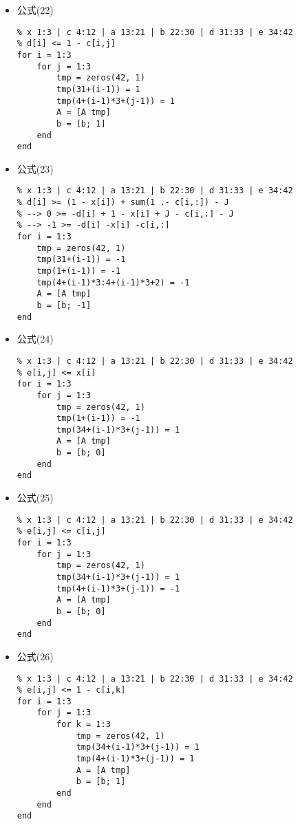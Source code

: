\documentclass[onecolumn,times]{article}
\begin{document}
\begin{CJK}{UTF8}{gkai}
\begin{itemize}
\item 公式(22)
\begin{Verbatim}
% x 1:3 | c 4:12 | a 13:21 | b 22:30 | d 31:33 | e 34:42
% d[i] <= 1 - c[i,j]
for i = 1:3
	for j = 1:3
		tmp = zeros(42, 1)
		tmp(31+(i-1)) = 1
		tmp(4+(i-1)*3+(j-1)) = 1
		A = [A tmp]
		b = [b; 1]
	end
end
\end{Verbatim}

\item 公式(23)
\begin{Verbatim}
% x 1:3 | c 4:12 | a 13:21 | b 22:30 | d 31:33 | e 34:42
% d[i] >= (1 - x[i]) + sum(1 .- c[i,:]) - J
% --> 0 >= -d[i] + 1 - x[i] + J - c[i,:] - J
% --> -1 >= -d[i] -x[i] -c[i,:]
for i = 1:3
	tmp = zeros(42, 1)
	tmp(31+(i-1)) = -1
	tmp(1+(i-1)) = -1
	tmp(4+(i-1)*3:4+(i-1)*3+2) = -1
	A = [A tmp]
	b = [b; -1]
end
\end{Verbatim}

\item 公式(24)
\begin{Verbatim}
% x 1:3 | c 4:12 | a 13:21 | b 22:30 | d 31:33 | e 34:42
% e[i,j] <= x[i]
for i = 1:3
	for j = 1:3
		tmp = zeros(42, 1)
		tmp(1+(i-1)) = -1
		tmp(34+(i-1)*3+(j-1)) = 1
		A = [A tmp]
		b = [b; 0]
	end
end
\end{Verbatim}

\item 公式(25)
\begin{Verbatim}
% x 1:3 | c 4:12 | a 13:21 | b 22:30 | d 31:33 | e 34:42
% e[i,j] <= c[i,j]
for i = 1:3
	for j = 1:3
		tmp = zeros(42, 1)
		tmp(34+(i-1)*3+(j-1)) = 1
		tmp(4+(i-1)*3+(j-1)) = -1
		A = [A tmp]
		b = [b; 0]
	end
end
\end{Verbatim}

\item 公式(26)
\begin{Verbatim}
% x 1:3 | c 4:12 | a 13:21 | b 22:30 | d 31:33 | e 34:42
% e[i,j] <= 1 - c[i,k]
for i = 1:3
	for j = 1:3
		for k = 1:3
			tmp = zeros(42, 1)
			tmp(34+(i-1)*3+(j-1)) = 1
			tmp(4+(i-1)*3+(j-1)) = 1
			A = [A tmp]
			b = [b; 1]
		end
	end
end
\end{Verbatim}


\end{itemize}
\end{CJK}
\end{document}
